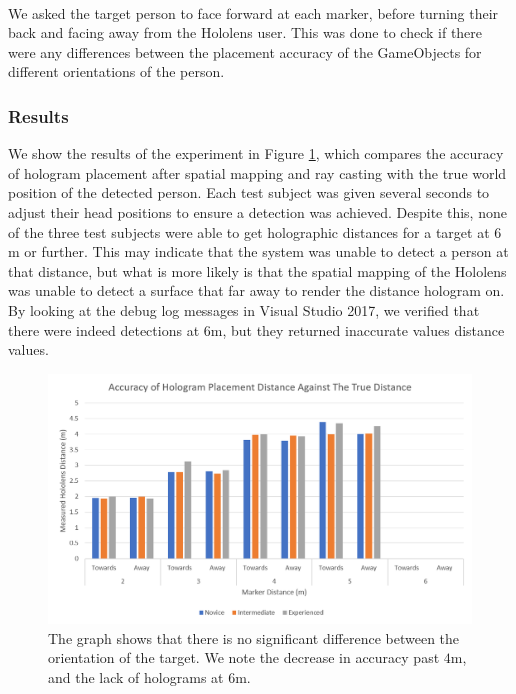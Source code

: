 \paragraph{} We asked the target person to face forward at each marker, before turning their back and facing away from the Hololens user. This was done to check if there were any differences between the placement accuracy of the GameObjects for different orientations of the person.


\subsubsection{Results}
We show the results of the experiment in Figure \ref{fig:hddResults}, which compares the accuracy of hologram placement after spatial mapping and ray casting with the true world position of the detected person. Each test subject was given several seconds to adjust their head positions to ensure a detection was achieved. Despite this, none of the three test subjects were able to get holographic distances for a target at $6$m or further. This may indicate that the system was unable to detect a person at that distance, but what is more likely  is that the spatial mapping of the Hololens was unable to detect a surface that far away to render the distance hologram on. By looking at the debug log messages in Visual Studio 2017, we verified that there were indeed detections at $6$m, but they returned inaccurate values distance values.

\begin{figure}[ht]
	\centering
	\includegraphics[width=1.0\linewidth]{img/chapter6_test/hddtestresults.png}
	\caption{The graph shows that there is no significant difference between the orientation of the target. We note the decrease in accuracy past $4$m, and the lack of holograms at $6$m.}
	\label{fig:hddResults}
\end{figure}

